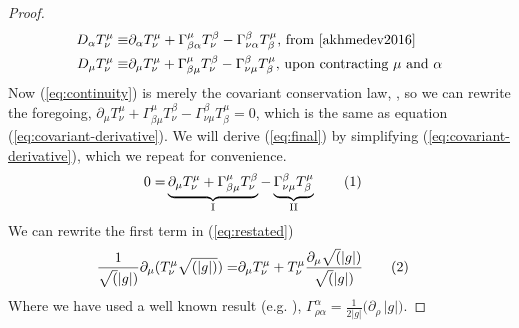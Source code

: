 \documentclass[]{article}
\newcommand\numberthis{\addtocounter{equation}{1}\tag{\theequation}}
\begin{document}
\begin{proof}
	\begin{align*}
	D_{\alpha} T^{\mu}_{\nu} 
	\equiv & \partial_{\alpha} T^{\mu}_{\nu} + \Gamma^{\mu}_{\beta\alpha}T^{\beta}_{\nu}-\Gamma^{\beta}_{\nu\alpha}T^{\mu}_{\beta} \text{, from \cite[(34)]{akhmedev2016}}\\
	D_{\mu} T^{\mu}_{\nu}
	\equiv & \partial_{\mu} T^{\mu}_{\nu} + \Gamma^{\mu}_{\beta\mu}T^{\beta}_{\nu}-\Gamma^{\beta}_{\nu\mu}T^{\mu}_{\beta}\text{, upon contracting $\mu$ and $\alpha$}
	\end{align*}
	Now (\ref{eq:continuity}) is merely the covariant conservation law, \cite[(80)]{akhmedev2016}, so we can rewrite the foregoing,
	$\partial_{\mu} T^{\mu}_{\nu} + \Gamma^{\mu}_{\beta\mu}T^{\beta}_{\nu}-\Gamma^{\beta}_{\nu\mu}T^{\mu}_{\beta}=0$, which is the same as equation (\ref{eq:covariant-derivative}). We will derive (\ref{eq:final}) by simplifying (\ref{eq:covariant-derivative}), which we repeat for convenience.
	\begin{align*}
	0= & \underbrace{\partial_{\mu} T^{\mu}_{\nu} + \Gamma^{\mu}_{\beta\mu}T^{\beta}_{\nu}}_\text{I}-\underbrace{\Gamma^{\beta}_{\nu\mu}T^{\mu}_{\beta}}_\text{II}\numberthis\label{eq:restated}
	\end{align*}
	We can rewrite the first term in (\ref{eq:restated})
	\begin{align*}
		\frac{1}{\sqrt(|g|)}\partial_{\mu}(T^{\mu}_{\nu}\sqrt{(|g|)}) =&\partial_{\mu}T^{\mu}_{\nu} + T^{\mu}_{\nu}\frac{\partial_{\mu}\sqrt(|g|)}{\sqrt(|g|)} \numberthis\label{eq:term1}
	\end{align*}
	Where we have used a well known result (e.g. \cite[equation (3.11)]{abs1965}), $\Gamma^{\alpha}_{\rho\alpha}=\frac{1}{2|g|}\big(\partial_\rho \, |g|\big)$.
	

\end{proof}
\end{document}
